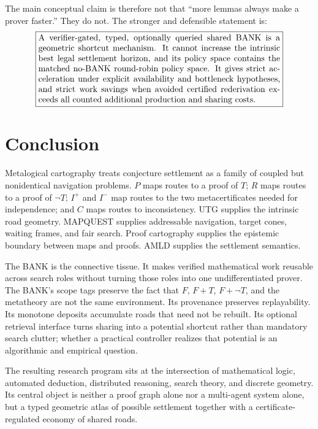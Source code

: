 \documentclass[11pt]{article}
\begin{document}
The main conceptual claim is therefore not that ``more lemmas always make a prover faster.'' They do not. The stronger and defensible statement is:
\[
\boxed{
\begin{minipage}{0.82\linewidth}
A verifier-gated, typed, optionally queried shared BANK is a geometric shortcut mechanism. It cannot increase the intrinsic best legal settlement horizon, and its policy space contains the matched no-BANK round-robin policy space. It gives strict acceleration under explicit availability and bottleneck hypotheses, and strict work savings when avoided certified rederivation exceeds all counted additional production and sharing costs.
\end{minipage}}
\]

\section{Conclusion}

Metalogical cartography treats conjecture settlement as a family of coupled but nonidentical navigation problems. $P$ maps routes to a proof of $T$; $R$ maps routes to a proof of $\neg T$; $I^+$ and $I^-$ map routes to the two metacertificates needed for independence; and $C$ maps routes to inconsistency. UTG supplies the intrinsic road geometry. MAPQUEST supplies addressable navigation, target cones, waiting frames, and fair search. Proof cartography supplies the epistemic boundary between maps and proofs. AMLD supplies the settlement semantics.

The BANK is the connective tissue. It makes verified mathematical work reusable across search roles without turning those roles into one undifferentiated prover. The BANK's scope tags preserve the fact that $F$, $F+T$, $F+\neg T$, and the metatheory are not the same environment. Its provenance preserves replayability. Its monotone deposits accumulate roads that need not be rebuilt. Its optional retrieval interface turns sharing into a potential shortcut rather than mandatory search clutter; whether a practical controller realizes that potential is an algorithmic and empirical question.

The resulting research program sits at the intersection of mathematical logic, automated deduction, distributed reasoning, search theory, and discrete geometry. Its central object is neither a proof graph alone nor a multi-agent system alone, but a typed geometric atlas of possible settlement together with a certificate-regulated economy of shared roads.
\end{document}
